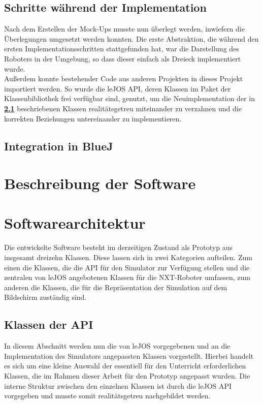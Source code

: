 \documentclass[paper=a4, pagesize, DIV=calc, BCOR=12.5mm, twoside=on, onecolumn=on, open = any, titlepage =on, parskip =half-, headsepline = on, footsepline = on, chapterprefix = on, appendixprefix = off, fontsize = 12pt, numbers = noenddot, abstract = on]{scrbook}
\numberwithin{equation}{chapter}
\theoremstyle{definition}
\theoremstyle{plain}
\theoremstyle{plain}
\theoremstyle{remark}
\theoremstyle{plain}
\theoremstyle{plain}
\begin{document}
\subsection{Schritte während der Implementation}
\onehalfspacing
Nach dem Erstellen der Mock-Ups musste nun überlegt werden, inwiefern die Überlegungen umgesetzt werden konnten. Die erste Abstraktion, die während den ersten Implementationsschritten stattgefunden hat, war die Darstellung des Roboters in der Umgebung, so dass dieser einfach als Dreieck implementiert wurde.\\

Außerdem konnte bestehender Code aus anderen Projekten in dieses Projekt importiert werden. So wurde die leJOS API, deren Klassen im Paket der Klassenbibliothek  frei verfügbar sind, genutzt, um die Neuimplementation der in \textbf{\ref{sec:API}} beschriebenen Klassen realitätsgetreu miteinander zu verzahnen und die korrekten Beziehungen untereinander zu implementieren.

\par \singlespacing
\subsection{Integration in BlueJ}
\onehalfspacing

\par \singlespacing
\section{Beschreibung der Software}
\onehalfspacing

\par \singlespacing
\section{Softwarearchitektur}
\onehalfspacing 
Die entwickelte Software besteht im derzeitigen Zustand als Prototyp aus insgesamt dreizehn Klassen. Diese lassen sich in zwei Kategorien aufteilen. Zum einen die Klassen, die die API für den Simulator zur Verfügung stellen und die zentralen von leJOS angebotenen Klassen für die NXT-Roboter umfassen, zum anderen die Klassen, die für die Repräsentation der Simulation auf dem Bildschirm zuständig sind.\\

\par \singlespacing
\subsection{Klassen der API}
\label{sec:API}
\onehalfspacing
In diesem Abschnitt werden nun die von leJOS vorgegebenen und an die Implementation des Simulators angepassten Klassen vorgestellt. Hierbei handelt es sich um eine kleine Auswahl der essentiell für den Unterricht erforderlichen Klassen, die im Rahmen dieser Arbeit für den Prototyp angepasst wurden. Die interne Struktur zwischen den einzelnen Klassen ist durch die leJOS API vorgegeben und musste somit realitätsgetreu nachgebildet werden.
\end{document}
